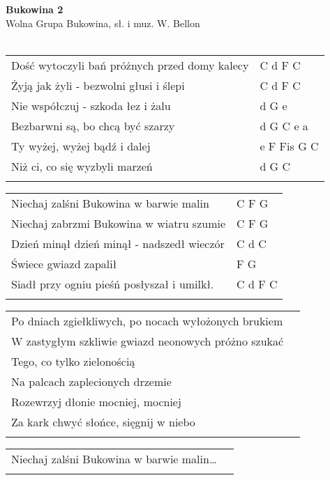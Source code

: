 \documentclass[a5paper]{article}
\begin{document}


\noindent
\fontsize{12pt}{15pt}\selectfont
\textbf{Bukowina 2} \\
\fontsize{8pt}{10pt}\selectfont
Wolna Grupa Bukowina, sł. i muz. W. Bellon  \\ \\
\fontsize{10pt}{12pt}\selectfont
{}
\begin{tabular}{@{}p{8.5cm}p{3cm}@{}}
\noindent
Dość wytoczyli bań próżnych przed domy kalecy & C d F C \\
Żyją jak żyli - bezwolni głusi i ślepi & C d F C \\
Nie współczuj - szkoda łez i żalu & d G e \\
Bezbarwni są, bo chcą być szarzy & d G C e a \\
Ty wyżej, wyżej bądź i dalej & e F Fis G C \\
Niż ci, co się wyzbyli marzeń & d G C \\ \\
\end{tabular}

\noindent
\begin{tabular}{@{}p{7.5cm}p{3cm}@{}}
Niechaj zalśni Bukowina w barwie malin & C F G \\
Niechaj zabrzmi Bukowina w wiatru szumie & C F G \\
Dzień minął dzień minął - nadszedł wieczór & C d C \\
Świece gwiazd zapalił & F G \\
Siadł przy ogniu pieśń posłyszał i umilkł. & C d  F C \\ \\
\end{tabular}

\noindent
\begin{tabular}{@{}p{8.5cm}p{3cm}@{}}
Po dniach zgiełkliwych, po nocach wyłożonych brukiem \\
W zastygłym szkliwie gwiazd neonowych próżno szukać \\
Tego, co tylko zielonością \\
Na palcach zaplecionych drzemie \\
Rozewrzyj dłonie mocniej, mocniej \\
Za kark chwyć słońce, sięgnij w niebo \\ \\
\end{tabular}

\noindent
\begin{tabular}{@{}p{8.5cm}p{3cm}@{}}
Niechaj zalśni Bukowina w barwie malin… \\ \\
\end{tabular}
\end{document}
